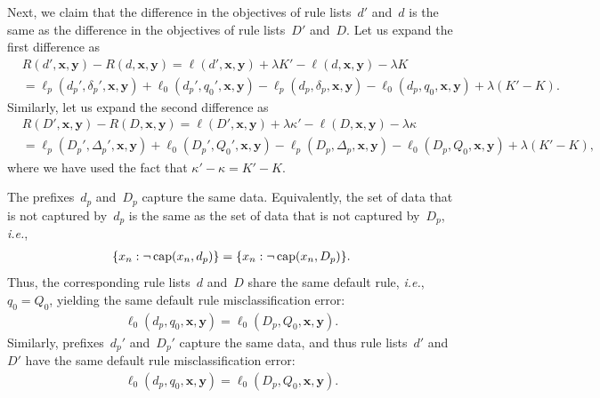 \documentclass[twoside,11pt]{article}
\def\ie{{\it i.e.},~}
\newcommand{\x}{\mathbf{x}}
\newcommand{\y}{\mathbf{y}}
\def\RL{{d}}
\def\Prefix{d_p}
\def\Labels{\delta_p}
\def\Default{q_0}
\def\RLB{{D}}
\def\PrefixB{D_p}
\def\LabelsB{\Delta_p}
\def\DefaultB{Q_0}
\def\Obj{R}
\def\Loss{\ell}
\def\Reg{{\lambda}}
\def\Cap{\textnormal{cap}}
\newcommand{\nn}{\nonumber}
\begin{document}
Next, we claim that the difference in the objectives
of rule lists~$\RL'$ and~$\RL$ is the same as the difference
in the objectives of rule lists~$\RLB'$ and~$\RLB$.
%
Let us expand the first difference as
\begin{align}
&\Obj(\RL', \x, \y) - \Obj(\RL, \x, \y)
  = \Loss(\RL', \x, \y) + \Reg K' - \Loss(\RL, \x, \y) - \Reg K \nn \\
&= \Loss_p(\Prefix', \Labels', \x, \y) + \Loss_0(\Prefix', \Default', \x, \y)
  - \Loss_p(\Prefix, \Labels, \x, \y) - \Loss_0(\Prefix, \Default, \x, \y)
  + \Reg (K' - K). \nn
\end{align}
Similarly, let us expand the second difference as
\begin{align}
&\Obj(\RLB', \x, \y) - \Obj(\RLB, \x, \y)
  = \Loss(\RLB', \x, \y) + \Reg \kappa' - \Loss(\RLB, \x, \y) - \Reg \kappa \nn \\
&= \Loss_p(\PrefixB', \LabelsB', \x, \y) + \Loss_0(\PrefixB', \DefaultB', \x, \y)
  - \Loss_p(\PrefixB, \LabelsB, \x, \y) - \Loss_0(\PrefixB, \DefaultB, \x, \y)
  + \Reg (K' - K), \nn
\end{align}
where we have used the fact that ${\kappa' - \kappa = K' - K}$.

The prefixes~$\Prefix$ and~$\PrefixB$ capture the same data.
%
Equivalently, the set of data that is not captured by~$\Prefix$
is the same as the set of data that is not captured by~$\PrefixB$, \ie
\begin{align}
\{x_n : \neg\, \Cap(x_n, \Prefix)\} = \{x_n : \neg\, \Cap(x_n, \PrefixB)\}. \nn
\end{align}
Thus, the corresponding rule lists~$\RL$ and~$\RLB$
share the same default rule, \ie ${\Default = \DefaultB}$,
yielding the same default rule misclassification error:
\begin{align}
\Loss_0(\Prefix, \Default, \x, \y) = \Loss_0(\PrefixB, \DefaultB, \x, \y). \nn
\end{align}
Similarly, prefixes~$\Prefix'$ and~$\PrefixB'$ capture
the same data, and thus rule lists~$\RL'$ and~$\RLB'$
have the same default rule misclassification error:
\begin{align}
\Loss_0(\Prefix, \Default, \x, \y) = \Loss_0(\PrefixB, \DefaultB, \x, \y). \nn
\end{align}
\end{document}

